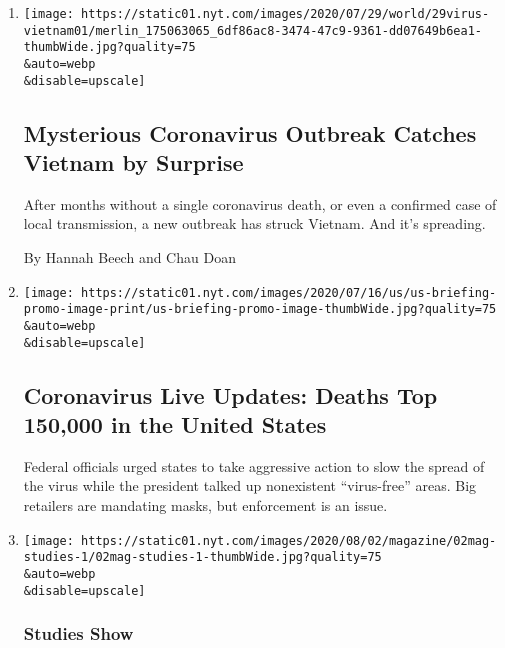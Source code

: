 \begin{enumerate}
\def\labelenumi{\arabic{enumi}.}
\item
  \href{/2020/07/29/world/asia/coronavirus-vietnam.html}{}

  \texttt{[image: https://static01.nyt.com/images/2020/07/29/world/29virus-vietnam01/merlin\_175063065\_6df86ac8-3474-47c9-9361-dd07649b6ea1-thumbWide.jpg?quality=75\\\&auto=webp\\\&disable=upscale]}

  \hypertarget{mysterious-coronavirus-outbreak-catches-vietnam-by-surprise}{%
  \subsection{Mysterious Coronavirus Outbreak Catches Vietnam by
  Surprise}\label{mysterious-coronavirus-outbreak-catches-vietnam-by-surprise}}

  After months without a single coronavirus death, or even a confirmed
  case of local transmission, a new outbreak has struck Vietnam. And
  it's spreading.

  By Hannah Beech and Chau Doan
\item
  \href{/2020/07/29/world/coronavirus-covid-19.html}{}

  \texttt{[image: https://static01.nyt.com/images/2020/07/16/us/us-briefing-promo-image-print/us-briefing-promo-image-thumbWide.jpg?quality=75\\\&auto=webp\\\&disable=upscale]}

  \hypertarget{coronavirus-live-updates-deaths-top-150000-in-the-united-states}{%
  \subsection{Coronavirus Live Updates: Deaths Top 150,000 in the United
  States}\label{coronavirus-live-updates-deaths-top-150000-in-the-united-states}}

  Federal officials urged states to take aggressive action to slow the
  spread of the virus while the president talked up nonexistent
  ``virus-free'' areas. Big retailers are mandating masks, but
  enforcement is an issue.
\item
  \href{/2020/07/29/magazine/schools-reopening-covid.html}{}

  \texttt{[image: https://static01.nyt.com/images/2020/08/02/magazine/02mag-studies-1/02mag-studies-1-thumbWide.jpg?quality=75\\\&auto=webp\\\&disable=upscale]}

  \hypertarget{studies-show}{%
  \subsubsection{Studies Show}\label{studies-show}}


\end{enumerate}

